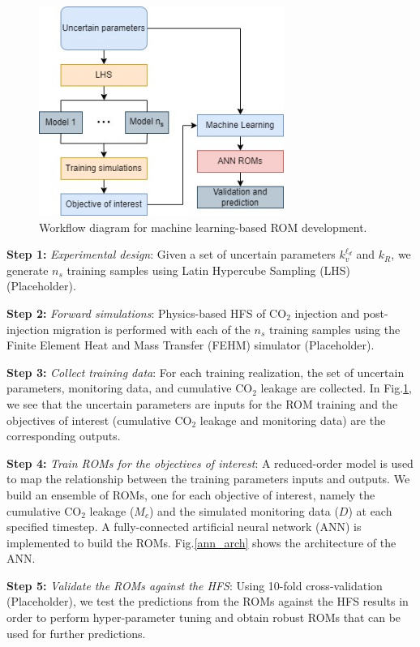 \documentclass[10pt, twoside]{article}
\begin{document}
\begin{figure} [H]
\centering
\includegraphics[width=8cm]{Figure 1.jpg}
\caption{Workflow diagram for machine learning-based ROM development.}
\label{mlrom}
\end{figure}

\textbf{Step 1:} \textit{Experimental design}: Given a set of uncertain parameters $k_{v}^{\ell_d}$ and $k_R$, we generate $n_s$ training samples using Latin Hypercube Sampling (LHS) (Placeholder).

\textbf{Step 2:} \textit{Forward simulations}: Physics-based HFS of CO$_2$ injection and post-injection migration is performed with each of the $n_s$ training samples using the Finite Element Heat and Mass Transfer (FEHM) simulator (Placeholder). 

\textbf{Step 3:} \textit{Collect training data}: For each training realization, the set of uncertain parameters, monitoring data, and cumulative CO$_2$ leakage are collected. In Fig.\ref{mlrom}, we see that the uncertain parameters are inputs for the ROM training and the objectives of interest (cumulative CO$_2$ leakage and monitoring data) are the corresponding outputs. 

\textbf{Step 4:} \textit{Train ROMs for the objectives of interest}: A reduced-order model is used to map the relationship between the training parameters inputs and outputs. We build an ensemble of ROMs, one for each objective of interest, namely the cumulative CO$_2$ leakage ($M_c$) and the simulated monitoring data ($D$) at each specified timestep. A fully-connected artificial neural network (ANN) is implemented to build the ROMs. Fig.\ref{ann_arch} shows the architecture of the ANN.

\textbf{Step 5:} \textit{Validate the ROMs against the HFS}: Using 10-fold cross-validation (Placeholder), we test the predictions from the ROMs against the HFS results in order to perform hyper-parameter tuning and obtain robust ROMs that can be used for further predictions.
\end{document}
